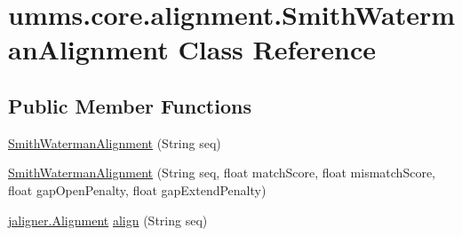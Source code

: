 \hypertarget{classumms_1_1core_1_1alignment_1_1_smith_waterman_alignment}{\section{umms.\+core.\+alignment.\+Smith\+Waterman\+Alignment Class Reference}
\label{classumms_1_1core_1_1alignment_1_1_smith_waterman_alignment}
}
\subsection*{Public Member Functions}
\begin{DoxyCompactItemize}
\item 
\hyperlink{classumms_1_1core_1_1alignment_1_1_smith_waterman_alignment_a362dd8843ac06c7a385d31c7a0f8f34b}{Smith\+Waterman\+Alignment} (String seq)
\item 
\hyperlink{classumms_1_1core_1_1alignment_1_1_smith_waterman_alignment_a457dc662dd7571f3d9e70f3f7f30b679}{Smith\+Waterman\+Alignment} (String seq, float match\+Score, float mismatch\+Score, float gap\+Open\+Penalty, float gap\+Extend\+Penalty)
\item 
\hyperlink{classjaligner_1_1_alignment}{jaligner.\+Alignment} \hyperlink{classumms_1_1core_1_1alignment_1_1_smith_waterman_alignment_a706f0da6b2375a6f6ae17316d79e4f47}{align} (String seq)
\end{DoxyCompactItemize}

